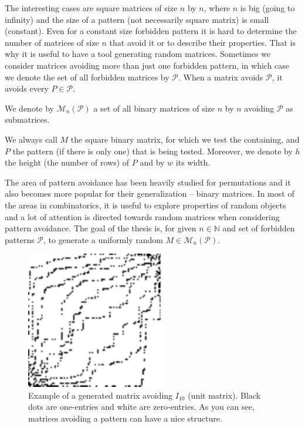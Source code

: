 The interesting cases are square matrices of size $n$ by $n$, where $n$ is big (going to infinity) and the size of a pattern (not necessarily square matrix) is small (constant). Even for a constant size forbidden pattern it is hard to determine the number of matrices of size $n$ that avoid it or to describe their properties. That is why it is useful to have a tool generating random matrices. Sometimes we consider matrices avoiding more than just one forbidden pattern, in which case we denote the set of all forbidden matrices by $\mathcal{P}$. When a matrix avoids $\mathcal{P}$, it avoids every $P\in\mathcal{P}$. 
\begin{ntn}
We denote by $\mathcal{M}_n(\mathcal{P})$ a set of all binary matrices of size $n$ by $n$ avoiding $\mathcal{P}$ as submatrices.
\end{ntn}
\begin{ntn}
We always call $M$ the square binary matrix, for which we test the containing, and $P$ the pattern (if there is only one) that is being tested. Moreover, we denote by $h$ the height (the number of rows) of $P$ and by $w$ its width.
\end{ntn}
The area of pattern avoidance has been heavily studied for permutations and it also becomes more popular for their generalization -- binary matrices. In most of the areas in combinatorics, it is useful to explore properties of random objects and a lot of attention is directed towards random matrices when considering pattern avoidance. The goal of the thesis is, for given $n\in\mathbb{N}$ and set of forbidden patterns $\mathcal{P}$, to generate a uniformly random $M\in\mathcal{M}_n(\mathcal{P})$.
\begin{figure}[h!]
\centering
\includegraphics[width=60mm]{../img/walking-diag.pdf}
\caption{Example of a generated matrix avoiding $I_{10}$ (unit matrix). Black dots are one-entries and white are zero-entries. As you can see, matrices avoiding a pattern can have a nice structure.}
\label{avoiding}
\end{figure}
